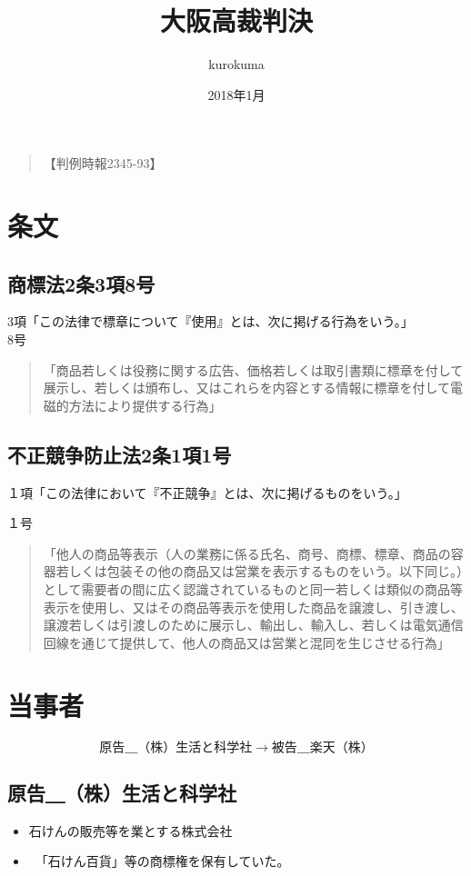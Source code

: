 \documentclass[dvipdfmx,draft,11pt]{jsarticle}
\begin{document}
\title{大阪高裁判決}
\author{kurokuma}
\date{2018年1月}
\maketitle



\begin{quotation}
【判例時報2345-93】\\

\end{quotation}

\section{条文}

\subsection{商標法2条3項8号}

3項「この法律で標章について『使用』とは、次に掲げる行為をいう。」\\

8号
\begin{quote}
「商品若しくは役務に関する広告、価格若しくは取引書類に標章を付して展示し、若しくは頒布し、又はこれらを内容とする情報に標章を付して電磁的方法により提供する行為」

\end{quote}

\subsection{不正競争防止法2条1項1号}


１項「この法律において『不正競争』とは、次に掲げるものをいう。」

１号
\begin{quote}
「他人の商品等表示（人の業務に係る氏名、商号、商標、標章、商品の容器若しくは包装その他の商品又は営業を表示するものをいう。以下同じ。）として需要者の間に広く認識されているものと同一若しくは類似の商品等表示を使用し、又はその商品等表示を使用した商品を譲渡し、引き渡し、譲渡若しくは引渡しのために展示し、輸出し、輸入し、若しくは電気通信回線を通じて提供して、他人の商品又は営業と混同を生じさせる行為」
\end{quote}

\section{当事者}

\[ 原告＿（株）生活と科学社　\to　被告＿楽天（株） \]


\subsection{原告＿（株）生活と科学社}

\begin{itemize}
	\item 石けんの販売等を業とする株式会社
	\item　「石けん百貨」等の商標権を保有していた。
\end{itemize}






 
\end{document}
